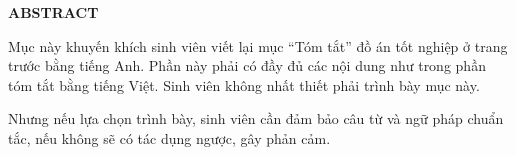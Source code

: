 \documentclass[../DoAn.tex]{subfiles}
\begin{document}
\begin{center}
    \Large{\textbf{ABSTRACT}}\\
\end{center}
\vspace{1cm}
Mục này khuyến khích sinh viên viết lại mục “Tóm tắt” đồ án tốt nghiệp ở trang trước bằng tiếng Anh. Phần này phải có đầy đủ các nội dung như trong phần tóm tắt bằng tiếng Việt.
Sinh viên không nhất thiết phải trình bày mục này. 

Nhưng nếu lựa chọn trình bày, sinh viên cần đảm bảo câu từ và ngữ pháp chuẩn tắc, nếu không sẽ có tác dụng ngược, gây phản cảm.
\end{document}
